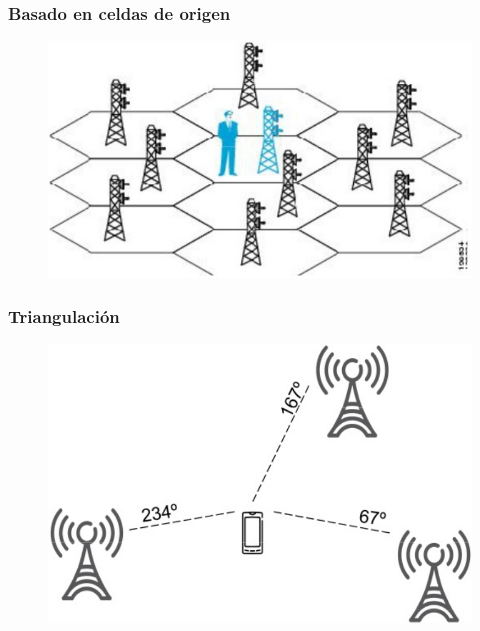 \documentclass[mathserif]{beamer}
\begin{document}
\begin{frame}
\frametitle{Basado en celdas de origen}

\begin{figure}
\includegraphics[width=.8\linewidth]{../figures_chesta/estado_del_arte/conection_based_positioning}
\end{figure}

\end{frame}


\begin{frame}
\frametitle{Triangulación}

\begin{figure}
\includegraphics[width=.8\linewidth]{../figures_chesta/estado_del_arte/triangulation}
\end{figure}

\end{frame}

\end{document}
